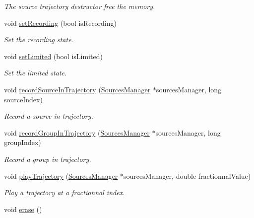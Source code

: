 \begin{DoxyCompactItemize}
\begin{DoxyCompactList}\small\item\em The source trajectory destructor free the memory. \end{DoxyCompactList}\item 
void \hyperlink{class_hoa2_d_1_1_sources_trajectory_aa225a14abe75ded0726d8f4bfa29bdbd}{set\-Recording} (bool is\-Recording)
\begin{DoxyCompactList}\small\item\em Set the recording state. \end{DoxyCompactList}\item 
void \hyperlink{class_hoa2_d_1_1_sources_trajectory_ad2456a1b3bec2079e5de4a048a6d81b5}{set\-Limited} (bool is\-Limited)
\begin{DoxyCompactList}\small\item\em Set the limited state. \end{DoxyCompactList}\item 
void \hyperlink{class_hoa2_d_1_1_sources_trajectory_ad3cf3a9e8a4833f1c90ada4874a74df1}{record\-Source\-In\-Trajectory} (\hyperlink{class_hoa2_d_1_1_sources_manager}{Sources\-Manager} $\ast$sources\-Manager, long source\-Index)
\begin{DoxyCompactList}\small\item\em Record a source in trajectory. \end{DoxyCompactList}\item 
void \hyperlink{class_hoa2_d_1_1_sources_trajectory_a98cf3aaa04964515e73fd9f74a8128b3}{record\-Group\-In\-Trajectory} (\hyperlink{class_hoa2_d_1_1_sources_manager}{Sources\-Manager} $\ast$sources\-Manager, long group\-Index)
\begin{DoxyCompactList}\small\item\em Record a group in trajectory. \end{DoxyCompactList}\item 
void \hyperlink{class_hoa2_d_1_1_sources_trajectory_ad6a6337c49063b1cb61e2ddde8cfdd5a}{play\-Trajectory} (\hyperlink{class_hoa2_d_1_1_sources_manager}{Sources\-Manager} $\ast$sources\-Manager, double fractionnal\-Value)
\begin{DoxyCompactList}\small\item\em Play a trajectory at a fractionnal index. \end{DoxyCompactList}\item 
\hypertarget{class_hoa2_d_1_1_sources_trajectory_adb8caed9806cb32f81593ca0d644180a}{void \hyperlink{class_hoa2_d_1_1_sources_trajectory_adb8caed9806cb32f81593ca0d644180a}{erase} ()}\label{class_hoa2_d_1_1_sources_trajectory_adb8caed9806cb32f81593ca0d644180a}


\end{DoxyCompactItemize}
